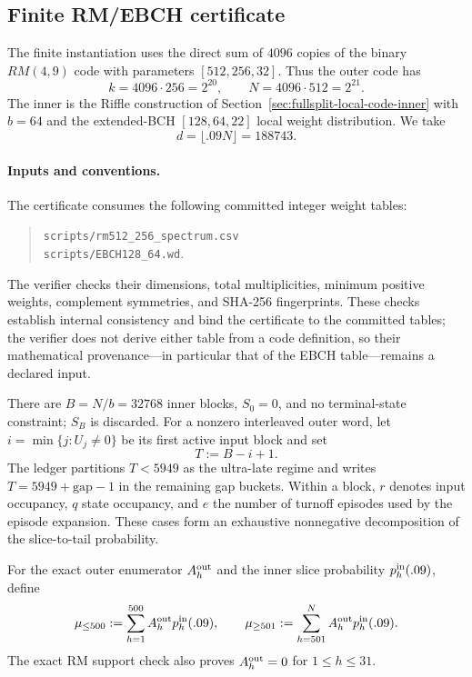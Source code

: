 \subsection{Finite RM/EBCH certificate}
\label{sec:rm-ebch-finite-certificate}

The finite instantiation uses the direct sum of \(4096\) copies of the binary
\(RM(4,9)\) code with parameters \([512,256,32]\).  Thus the outer code has
\[
 k=4096\cdot256=2^{20},\qquad N=4096\cdot512=2^{21}.
\]
The inner is the Riffle construction of
Section~\ref{sec:fullsplit-local-code-inner} with \(b=64\) and the extended-BCH
\([128,64,22]\) local weight distribution.  We take
\[
 d=\lfloor .09N\rfloor=188743.
\]

\paragraph{Inputs and conventions.}
The certificate consumes the following committed integer weight tables:
\begin{quote}
\texttt{scripts/rm512\_256\_spectrum.csv}\\
\texttt{scripts/EBCH128\_64.wd}.
\end{quote}
The verifier checks their dimensions, total multiplicities, minimum positive
weights, complement symmetries, and SHA-256 fingerprints.  These checks
establish internal consistency and bind the certificate to the committed
tables; the verifier does not derive either table from a code definition, so
their mathematical provenance---in particular that of the EBCH table---remains
a declared input.

There are \(B=N/b=32768\) inner blocks, \(S_0=0\), and no terminal-state
constraint; \(S_B\) is discarded.  For a nonzero interleaved outer word, let
\(i=\min\{j:U_j\ne0\}\) be its first active input block and set
\[
 T:=B-i+1.
\]
The ledger partitions \(T<5949\) as the ultra-late regime and writes
\(T=5949+\mathrm{gap}-1\) in the remaining gap buckets.  Within a block, \(r\)
denotes input occupancy, \(q\) state occupancy, and \(e\) the number of
turnoff episodes used by the episode expansion.  These cases form an exhaustive
nonnegative decomposition of the slice-to-tail probability.

For the exact outer enumerator \(A_h^{\rm out}\) and the inner slice probability
\(p_h^{\rm in}(.09)\), define
\[
 \mu_{\le500}:=\sum_{h=1}^{500}A_h^{\rm out}p_h^{\rm in}(.09),\qquad
 \mu_{\ge501}:=\sum_{h=501}^{N}A_h^{\rm out}p_h^{\rm in}(.09).
\]
The exact RM support check also proves \(A_h^{\rm out}=0\) for
\(1\le h\le31\).

